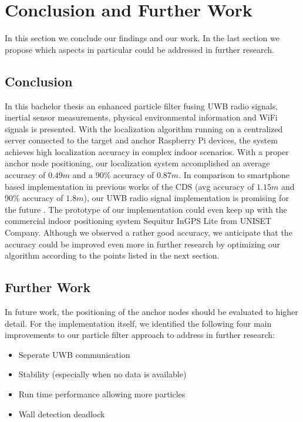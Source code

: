 
\chapter{Conclusion and Further Work} %

\label{Chapter7} %
In this section we conclude our findings and our work. In the last section we propose which aspects in particular could be addressed in further research. 


\section{Conclusion}
In this bachelor thesis an enhanced particle filter fusing UWB radio signals, inertial sensor measurements, physical environmental information and WiFi signals is presented. With the localization algorithm running on a centralized server connected to the target and anchor Raspberry Pi devices, the system achieves high localization accuracy in complex indoor scenarios. With a proper anchor node positioning, our localization system accomplished an average accuracy of $0.49m$ and a 90\% accuracy of $0.87m$. In comparison to smartphone based implementation in previous works of the CDS (avg accuracy of $1.15m$ and 90\% accuracy of $1.8m$), our UWB radio signal implementation is promising for the future \cite{Carrera}. The prototype of our implementation could even keep up with the commercial indoor positioning system Sequitur InGPS Lite from UNISET Company. Although we observed a rather good accuracy, we anticipate that the accuracy could be improved even more in further research by optimizing our algorithm according to the points listed in the next section.



\section{Further Work}
In future work, the positioning of the anchor nodes should be evaluated to higher detail. For the implementation itself, we identified the following four main improvements to our particle filter approach to address in further research:
\begin{itemize}
\item Seperate UWB communication
\item Stability (especially when no data is available)
\item Run time performance allowing more particles
\item Wall detection deadlock
\end{itemize}

